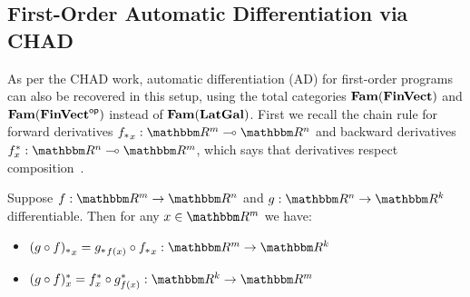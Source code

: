 \subsection{First-Order Automatic Differentiation via CHAD}
\label{sec:first-order:autodiff}

As per the CHAD work, automatic differentiation (AD) for first-order programs can also be recovered in this
setup, using the total categories $\mathbf{Fam}(\mathbf{FinVect})$ and $\mathbf{Fam}(\mathbf{FinVect}^{\mathsf{op}})$ instead of $\mathbf{Fam}(\mathbf{LatGal})$. First
we recall the chain rule for forward derivatives $\pushf{f}_x: \RR^m \linearto \RR^n$ and backward derivatives
$\pullf{f}_x: \RR^n \linearto \RR^m$, which says that derivatives respect composition~\cite{spivak65}.

%
%

\begin{proposition}
Suppose $f: \RR^m \to \RR^n$ and $g: \RR^n \to \RR^k$ differentiable. Then for any $x \in \RR^m$ we have:

\begin{itemize}
\item $\pushf{(g \comp f)}_x = \pushf{g}_{f(x)} \comp \pushf{f}_x: \RR^m \to \RR^k$
\item $\pullf{(g \comp f)}_x = \pullf{f}_{x} \comp \pullf{g}_{f(x)}: \RR^k \to \RR^m$
\end{itemize}
\end{proposition}

